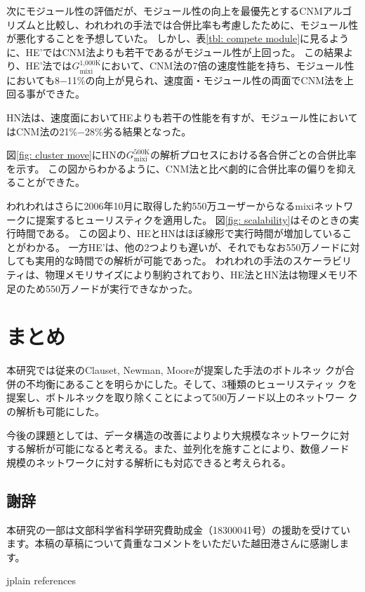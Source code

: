 \documentclass [a4j,11pt] {jsarticle}
\begin{document}
次にモジュール性の評価だが、モジュール性の向上を最優先とするCNMアルゴリズムと比較し、われわれの手法では合併比率も考慮したために、モジュール性が悪化することを予想していた。
しかし、表\ref{tbl: compete module}に見るように、HE'ではCNM法よりも若干であるがモジュール性が上回った。
この結果より、HE'法では$G_{\text{mixi}}^{\text{1,000K}}$において、CNM法の7倍の速度性能を持ち、モジュール性においても8−11\%の向上が見られ、速度面・モジュール性の両面でCNM法を上回る事ができた。

HN法は、速度面においてHEよりも若干の性能を有すが、モジュール性においてはCNM法の21\%−28\%劣る結果となった。

図\ref{fig: cluster move}にHNの$G_{\text{mixi}}^{\text{500K}}$の解析プロセスにおける各合併ごとの合併比率を示す。
この図からわかるように、CNM法と比べ劇的に合併比率の偏りを抑えることができた。

われわれはさらに2006年10月に取得した約550万ユーザーからなるmixiネットワークに提案するヒューリスティクを適用した。
図\ref{fig: scalability}はそのときの実行時間である。
この図より、HEとHNはほぼ線形で実行時間が増加していることがわかる。
一方HE'は、他の2つよりも遅いが、それでもなお550万ノードに対しても実用的な時間での解析が可能であった。
われわれの手法のスケーラビリティは、物理メモリサイズにより制約されており、HE法とHN法は物理メモリ不足のため550万ノードが実行できなかった。


\section {まとめ}
\label {sect: summary}

本研究では従来のClauset, Newman, Mooreが提案した手法のボトルネッ
クが合併の不均衡にあることを明らかにした。そして、3種類のヒューリスティッ
クを提案し、ボトルネックを取り除くことによって500万ノード以上のネットワー
クの解析も可能にした。

今後の課題としては、データ構造の改善によりより大規模なネットワークに対
する解析が可能になると考える。また、並列化を施すことにより、数億ノード
規模のネットワークに対する解析にも対応できると考えられる。

\subsection*{謝辞}

本研究の一部は文部科学省科学研究費助成金（18300041号）の援助を受けてい
ます。本稿の草稿について貴重なコメントをいただいた越田港さんに感謝しま
す。


 {jplain} %
 {references}
\end{document}
